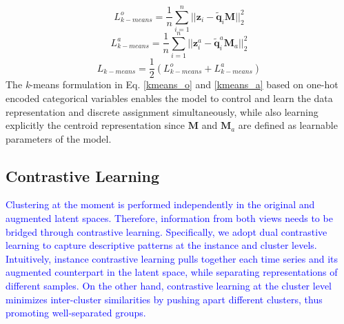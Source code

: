 \documentclass[times, review, 10pt]{elsarticle}
\begin{document}
%
\begin{equation}
    L_{k-means}^o = \frac{1}{n} \sum_{i=1}^n \lvert\lvert \mathbf{z}_i - \mathbf{\tilde{q}}_i\mathbf{M} \rvert\rvert_2^2
    \label{kmeans_o}
\end{equation}
%
\begin{equation}
    L_{k-means}^a = \frac{1}{n} \sum_{i=1}^n \lvert\lvert \mathbf{z}_i^a - \mathbf{\tilde{q}}_i^a\mathbf{M}_a \rvert\rvert_2^2
    \label{kmeans_a}
\end{equation}
%
\begin{equation}
    L_{k-means} = \frac{1}{2} (L_{k-means}^o + L_{k-means}^a)
\end{equation}
%
The \textit{k}-means formulation in Eq. \ref{kmeans_o} and \ref{kmeans_a} based on one-hot encoded categorical variables enables the model to control and learn the data representation and discrete assignment simultaneously, while also learning explicitly the centroid representation since $\mathbf{M}$ and $\mathbf{M}_a$ are defined as learnable parameters of the model.

\subsection{Contrastive Learning}
\textcolor{blue}{Clustering at the moment is performed independently in the original and augmented latent spaces. Therefore, information from both views needs to be bridged through contrastive learning. Specifically, we adopt dual contrastive learning \cite{li2021contrastive,zhong2023deep} to capture descriptive patterns at the instance and cluster levels. Intuitively, instance contrastive learning pulls together each time series and its augmented counterpart in the latent space, while separating representations of different samples. On the other hand, contrastive learning at the cluster level minimizes inter-cluster similarities by pushing apart different clusters, thus promoting well-separated groups.}
\end{document}
